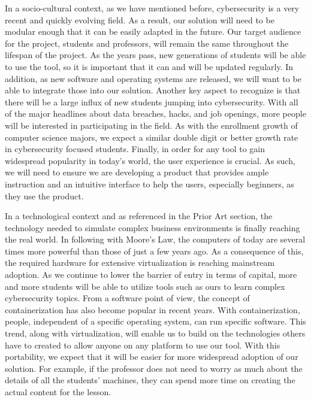 \documentclass[openright]{report}
\begin{document}
\par In a socio-cultural context, as we have mentioned before, cybersecurity is a very recent and quickly evolving field. As a result, our solution will need to be modular enough that it can be easily adapted in the future. Our target audience for the project, students and professors, will remain the same throughout the lifespan of the project. As the years pass, new generations of students will be able to use the tool, so it is important that it can and will be updated regularly. In addition, as new software and operating systems are released, we will want to be able to integrate those into our solution. Another key aspect to recognize is that there will be a large influx of new students jumping into cybersecurity. With all of the major headlines about data breaches, hacks, and job openings, more people will be interested in participating in the field. As with the enrollment growth of computer science majors, we expect a similar double digit or better growth rate in cybersecurity focused students. Finally, in order for any tool to gain widespread popularity in today's world, the user experience is crucial. As such, we will need to ensure we are developing a product that provides ample instruction and an intuitive interface to help the users, especially beginners, as they use the product.

\par In a technological context and as referenced in the Prior Art section, the technology needed to simulate complex business environments is finally reaching the real world. In following with Moore's Law, the computers of today are several times more powerful than those of just a few years ago. As a consequence of this, the required hardware for extensive virtualization is reaching mainstream adoption. As we continue to lower the barrier of entry in terms of capital, more and more students will be able to utilize tools such as ours to learn complex cybersecurity topics. From a software point of view, the concept of containerization has also become popular in recent years. With containerization, people, independent of a specific operating system, can run specific software\cite{docker}. This trend, along with virtualization, will enable us to build on the technologies others have to created to allow anyone on any platform to use our tool. With this portability, we expect that it will be easier for more widespread adoption of our solution. For example, if the professor does not need to worry as much about the details of all the students' machines, they can spend more time on creating the actual content for the lesson.
\end{document}
